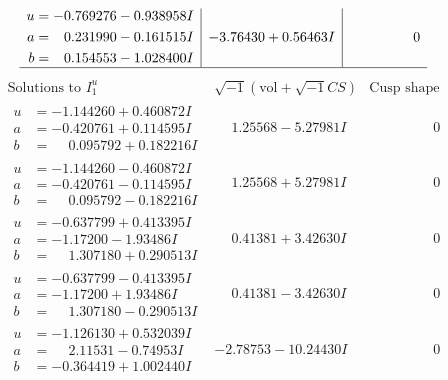 \documentclass[1p]{elsarticle_modified}
\theoremstyle{definition}
\newcommand{\I}{\sqrt{-1}}
\begin{document}
$$\begin{array}{c|c|c}
\begin{aligned}
u &= -0.769276 - 0.938958 I \\
a &= \phantom{-}0.231990 - 0.161515 I \\
b &= \phantom{-}0.154553 - 1.028400 I\end{aligned}
 & -3.76430 + 0.56463 I & \phantom{-0.000000 } 0\\
 \hline 
 \end{array}$$\newpage$$\begin{array}{c|c|c}  
\text{Solutions to }I^u_{1}& \I (\text{vol} + \sqrt{-1}CS) & \text{Cusp shape}\\
 \hline 
\begin{aligned}
u &= -1.144260 + 0.460872 I \\
a &= -0.420761 + 0.114595 I \\
b &= \phantom{-}0.095792 + 0.182216 I\end{aligned}
 & \phantom{-}1.25568 - 5.27981 I & \phantom{-0.000000 } 0 \\ \hline\begin{aligned}
u &= -1.144260 - 0.460872 I \\
a &= -0.420761 - 0.114595 I \\
b &= \phantom{-}0.095792 - 0.182216 I\end{aligned}
 & \phantom{-}1.25568 + 5.27981 I & \phantom{-0.000000 } 0 \\ \hline\begin{aligned}
u &= -0.637799 + 0.413395 I \\
a &= -1.17200 - 1.93486 I \\
b &= \phantom{-}1.307180 + 0.290513 I\end{aligned}
 & \phantom{-}0.41381 + 3.42630 I & \phantom{-0.000000 } 0 \\ \hline\begin{aligned}
u &= -0.637799 - 0.413395 I \\
a &= -1.17200 + 1.93486 I \\
b &= \phantom{-}1.307180 - 0.290513 I\end{aligned}
 & \phantom{-}0.41381 - 3.42630 I & \phantom{-0.000000 } 0 \\ \hline\begin{aligned}
u &= -1.126130 + 0.532039 I \\
a &= \phantom{-}2.11531 - 0.74953 I \\
b &= -0.364419 + 1.002440 I\end{aligned}
 & -2.78753 - 10.24430 I & \phantom{-0.000000 } 0 \\ \hline\begin{aligned}

\end{aligned}
\end{array}$$
\end{document}
